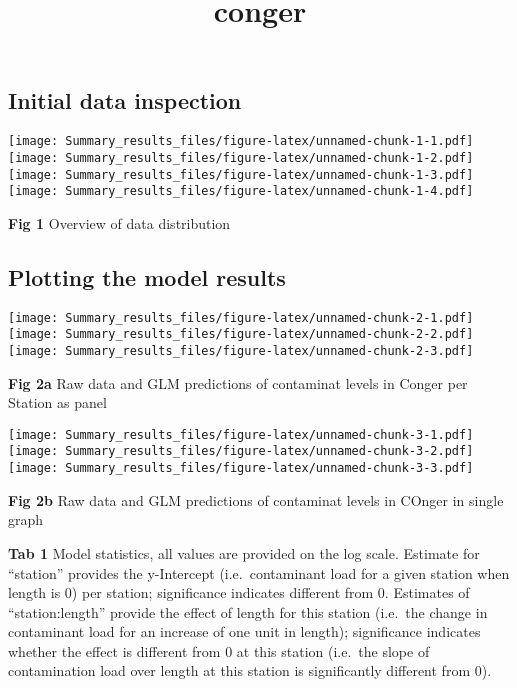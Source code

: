 \documentclass[
]{article}
\title{conger}
\author{}
\date{\vspace{-2.5em}}
\begin{document}
\maketitle

\hypertarget{initial-data-inspection}{%
\subsection{Initial data inspection}\label{initial-data-inspection}}

\texttt{[image: Summary\_results\_files/figure-latex/unnamed-chunk-1-1.pdf]}
\texttt{[image: Summary\_results\_files/figure-latex/unnamed-chunk-1-2.pdf]}
\texttt{[image: Summary\_results\_files/figure-latex/unnamed-chunk-1-3.pdf]}
\texttt{[image: Summary\_results\_files/figure-latex/unnamed-chunk-1-4.pdf]}

\textbf{Fig 1} Overview of data distribution

\hypertarget{plotting-the-model-results}{%
\subsection{Plotting the model
results}\label{plotting-the-model-results}}

\texttt{[image: Summary\_results\_files/figure-latex/unnamed-chunk-2-1.pdf]}
\texttt{[image: Summary\_results\_files/figure-latex/unnamed-chunk-2-2.pdf]}
\texttt{[image: Summary\_results\_files/figure-latex/unnamed-chunk-2-3.pdf]}

\textbf{Fig 2a} Raw data and GLM predictions of contaminat levels in
Conger per Station as panel

\texttt{[image: Summary\_results\_files/figure-latex/unnamed-chunk-3-1.pdf]}
\texttt{[image: Summary\_results\_files/figure-latex/unnamed-chunk-3-2.pdf]}
\texttt{[image: Summary\_results\_files/figure-latex/unnamed-chunk-3-3.pdf]}

\textbf{Fig 2b} Raw data and GLM predictions of contaminat levels in
COnger in single graph

\textbf{Tab 1} Model statistics, all values are provided on the log
scale. Estimate for ``station'' provides the y-Intercept
(i.e.~contaminant load for a given station when length is 0) per
station; significance indicates different from 0. Estimates of
``station:length'' provide the effect of length for this station
(i.e.~the change in contaminant load for an increase of one unit in
length); significance indicates whether the effect is different from 0
at this station (i.e.~the slope of contamination load over length at
this station is significantly different from 0).
\end{document}
